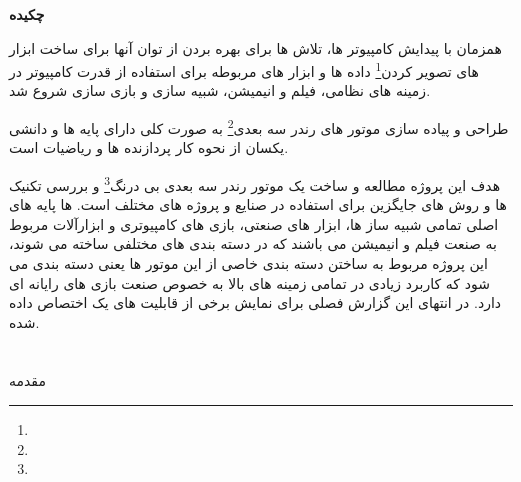 \documentclass[a4paper, 12pt]{report}
\makeatletter
\renewcommand\@endpart{\vfil
              \if@twoside
                \null
                \thispagestyle{empty}%
                \newpage
              \fi
              \if@tempswa
                \twocolumn
              \fi}
\newcommand{\lrbold}[1]{\lr{\textbf{#1}}}
\makeatother
\begin{document}
\fontsize{13}{1cm}\mitrafont\textbf{چکیده}
\normalsize
\begin{flushright}
\justifying
\fontsize{13}{0.8cm}\mitrafont
  همزمان با پیدایش کامپیوتر ها، تلاش ها برای بهره بردن از توان آنها برای ساخت ابزار های تصویر کردن\footnote{} داده ها و ابزار های مربوطه برای
  استفاده از قدرت کامپیوتر در زمینه های نظامی، فیلم و انیمیشن، شبیه سازی و بازی سازی شروع شد.\par
    طراحی و پیاده سازی موتور های رندر سه بعدی\footnote{} به صورت کلی دارای پایه ها و دانشی یکسان از نحوه کار پردازنده ها و ریاضیات است.\par
    هدف این پروژه مطالعه و ساخت یک  موتور رندر سه بعدی بی درنگ\footnote{} و بررسی تکنیک ها و روش های جایگزین برای استفاده در صنایع و پروژه های مختلف است.  ها پایه های اصلی تمامی شبیه ساز ها، ابزار های صنعتی، بازی های کامپیوتری و ابزارآلات مربوط به صنعت فیلم و انیمیشن می باشند که در دسته بندی های مختلفی ساخته می شوند، این پروژه مربوط به ساختن دسته بندی خاصی از این موتور ها یعنی دسته بندی  می شود که کاربرد زیادی در تمامی زمینه های بالا به خصوص صنعت بازی های رایانه ای دارد.
   در انتهای این گزارش فصلی برای نمایش برخی از قابلیت های یک  اختصاص داده شده.

\end{flushright}


\begingroup
  \hypersetup{hidelinks}
  \tableofcontents
  \listoffigures
\endgroup

\makeatletter
\renewcommand\@endpart{\vfil
              \if@twoside
                \null
                \thispagestyle{empty}%
                \newpage
              \fi
              \if@tempswa
                \twocolumn
              \fi}
\makeatother

\chapter{\fontsize{18pt}{1.0cm}\zarbold\lrbold{Renderer}}


\fontsize{13pt}{1cm}\zarfont

\huge
    مقدمه
\end{document}
